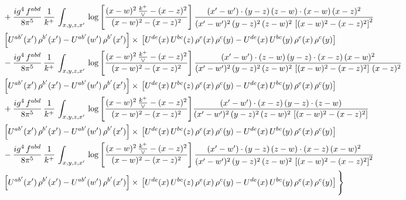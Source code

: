 \documentclass[10pt]{article}
\numberwithin{equation}{section}
\begin{document}
\begin{align}
& +\frac{ig^{4}\, f^{abd}}{8\pi^{5}}\, \frac{1}{k^{+}}\, \int_{x,y,z,x'}\,\log{\left[\frac{(x-w)^{2}\,\frac{k^{+}}{\vee}-(x-z)^{2}}{(x-w)^{2}-(x-z)^{2}}\right]}\,\frac{(x'-w')\cdot  (y-z)\, (z-w)\cdot (x-w)\, (x-z)^{2}}{(x'-w')^{2}\, (y-z)^{2}\, (z-w)^{2}\,\left[(x-w)^{2}-(x-z)^{2}\right]^{2}}\, \notag \\ & \left[U^{ab'}(x')\,\rho^{b'}(x')-U^{ab'}(w')\, \rho^{b'}(x')\right]\times\,\left[U^{de}(x)\,U^{bc}(z)\, \rho^{e}(x)\,\rho^{c}(y)-U^{de}(x)\,U^{bc}(y)\,\rho^{e}(x)\,\rho^{c}(y)\right] \notag \\
& - \frac{ig^{4}\, f^{abd}}{8\pi^{5}}\, \frac{1}{k^{+}}\, \int_{x,y,z,x'}\,\log{\left[\frac{(x-w)^{2}\,\frac{k^{+}}{\vee}-(x-z)^{2}}{(x-w)^{2}-(x-z)^{2}}\right]}\,\frac{(x'-w')\cdot (z-w)\, (y-z)\cdot (x-z)\, (x-w)^{2}}{(x'-w')^{2}\, (y-z)^{2}\, (z-w)^{2}\,\left[(x-w)^{2} - (x-z)^{2}\right]\, (x-z)^{2}}\, \notag \\ & \left[U^{ab'}(x')\,\rho^{b'}(x')-U^{ab'}(w')\, \rho^{b'}(x')\right]\times\,\left[U^{de}(x)\,U^{bc}(z)\, \rho^{e}(x)\,\rho^{c}(y)-U^{de}(x)\,U^{bc}(y)\,\rho^{e}(x)\,\rho^{c}(y)\right] \notag \\
& +\frac{ig^{4}\, f^{abd}}{8\pi^{5}}\, \frac{1}{k^{+}}\, \int_{x,y,z,x'}\,\log{\left[\frac{(x-w)^{2}\,\frac{k^{+}}{\vee}-(x-z)^{2}}{(x-w)^{2}-(x-z)^{2}}\right]}\frac{(x'-w')\cdot (x-z)\, (y-z)\cdot (z-w)}{(x'-w')^{2}\, (y-z)^{2}\, (z-w)^{2}\,\left[(x-w)^{2} -(x-z)^{2}\right]}\, \notag \\ & \left[U^{ab'}(x')\,\rho^{b'}(x')-U^{ab'}(w')\, \rho^{b'}(x')\right]\times\,\left[U^{de}(x)\,U^{bc}(z)\, \rho^{e}(x)\,\rho^{c}(y)-U^{de}(x)\,U^{bc}(y)\,\rho^{e}(x)\,\rho^{c}(y)\right] \notag \\
& -\frac{ig^{4}\, f^{abd}}{8\pi^{5}}\, \frac{1}{k^{+}}\, \int_{x,y,z,x'}\,\log{\left[\frac{(x-w)^{2}\,\frac{k^{+}}{\vee}-(x-z)^{2}}{(x-w)^{2}-(x-z)^{2}}\right]}\,\frac{(x'-w')\cdot (y-z)\, (z-w)\cdot (x-z)\,(x-w)^{2}}{(x'-w')^{2}\, (y-z)^{2}\, (z-w)^{2}\,\left[(x-w)^{2}-(x-z)^{2}\right]^{2}}\, \notag \\ & \left[U^{ab'}(x')\,\rho^{b'}(x')-U^{ab'}(w')\, \rho^{b'}(x')\right]\times\,\left[U^{de}(x)\,U^{bc}(z)\, \rho^{e}(x)\,\rho^{c}(y)-U^{de}(x)\,U^{bc}(y)\,\rho^{e}(x)\,\rho^{c}(y)\right]\Bigg\} \label{eq:R:G1IIIN2}
\end{align}
\end{document}
